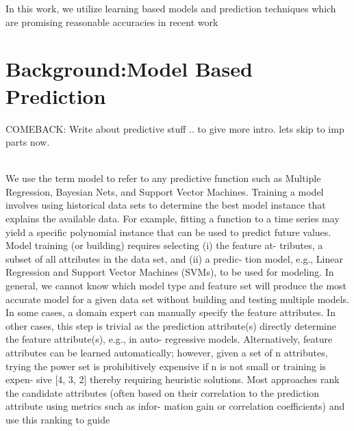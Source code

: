 \documentclass{article}
\begin{document}
\begin{multicols}{2}
	In this work, we utilize learning based models and prediction techniques which are promising reasonable accuracies in recent work \cite{ganapathi,MSR,ICDE2012}
	
	\section{Background:Model Based Prediction}	
COMEBACK:	Write about predictive stuff .. to give more intro. lets skip to imp parts now.

\hfill\\

	We use the term model to refer to any predictive function such as
	Multiple Regression, Bayesian Nets, and Support Vector Machines.
	Training a model involves using historical data sets to determine the
	best model instance that explains the available data. For example,
	fitting a function to a time series may yield a specific polynomial
	instance that can be used to predict future values.
	Model training (or building) requires selecting (i) the feature at-
	tributes, a subset of all attributes in the data set, and (ii) a predic-
	tion model, e.g., Linear Regression and Support Vector Machines
	(SVMs), to be used for modeling. In general, we cannot know
	which model type and feature set will produce the most accurate
	model for a given data set without building and testing multiple
	models. In some cases, a domain expert can manually specify the
	feature attributes. In other cases, this step is trivial as the prediction
	attribute(s) directly determine the feature attribute(s), e.g., in auto-
	regressive models. Alternatively, feature attributes can be learned
	automatically; however, given a set of n attributes, trying the power
	set is prohibitively expensive if n is not small or training is expen-
	sive [4, 3, 2] thereby requiring heuristic solutions.
	Most approaches rank the candidate attributes (often based on their
	correlation to the prediction attribute using metrics such as infor-
	mation gain or correlation coefficients) and use this ranking to guide
	

\end{multicols}
\end{document}
